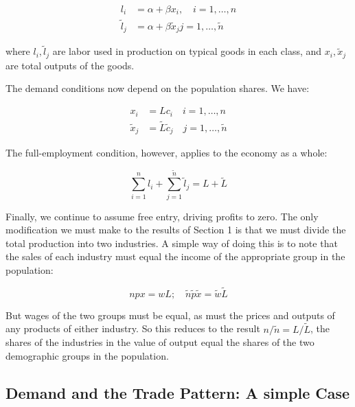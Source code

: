 \begin{equation}
  \begin{aligned}
  l_i & = \alpha + \beta x_i, \quad i = 1, \ldots, n \\
  \tilde{l}_j & = \alpha + \beta \tilde{x}_j j = 1, \ldots, \tilde{n}
\end{aligned}
\end{equation}

where $l_i, \tilde{l}_j$ are labor used in production on typical goods in each class, and $x_i, \tilde{x}_j$ are total outputs of the goods.

The demand conditions now depend on the population shares. We have:

\begin{equation}
  \begin{aligned}
  x_i & = Lc_i \quad i = 1, \ldots, n \\
  \tilde{x}_j & = \tilde{L}\tilde{c}_j \quad j = 1, \ldots, \tilde{n}
  \end{aligned}
\end{equation}

The full-employment condition, however, applies to the economy as a whole:

\begin{equation}
  \sum_{i=1}^n l_i + \sum_{j=1}^{\tilde{n}} \tilde{l}_j = L + \tilde{L}
\end{equation}

Finally, we continue to assume free entry, driving profits to zero. The only modification we must make to the results of Section 1 is that we must divide the total production into two industries. A simple way of doing this is to note that the sales of each industry must equal the income of the appropriate group in the population:

\begin{equation}
    npx = wL; \quad \tilde{n}\tilde{p}\tilde{x} = \tilde{w}\tilde{L}
\end{equation}

But wages of the two groups must be equal, as must the prices and outputs of any products of either industry. So this reduces to the result $n/\tilde{n} = L/\tilde{L}$, the shares of the industries in the value of output equal the shares of the two demographic groups in the population.

\subsection{Demand and the Trade Pattern: A simple Case}

